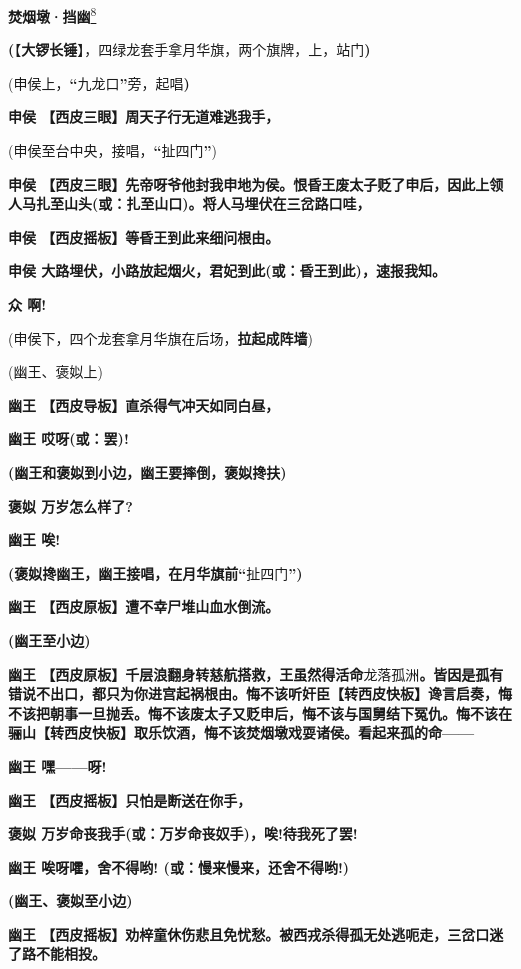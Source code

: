 \textbf{焚烟墩·挡幽}\protect\hyperlink{fn8}{\textsuperscript{8}}

\textbf{(}【\textbf{大锣长锤}】，四绿龙套手拿月华旗，两个旗牌，上，站门\textbf{)}

(申侯上，\textbf{``}九龙口\textbf{''}旁，起唱\textbf{)}

\textbf{申侯 【西皮三眼】周天子行无道难逃我手，}

(申侯至台中央，接唱，\textbf{``}扯四门\textbf{''})

\textbf{申侯
【西皮三眼】先帝呀爷他封我申地为侯。恨昏王废太子贬了申后，因此上领人马扎至山头(或：扎至山口)。将人马埋伏在三岔路口哇，}

\textbf{申侯 【西皮摇板】等昏王到此来细问根由。}

\textbf{申侯 大路埋伏，小路放起烟火，君妃到此(或：昏王到此)，速报我知。}

\textbf{众 啊!}

(申侯下，四个龙套拿月华旗在后场，\textbf{拉起成阵墙})

(幽王、褒姒上)

\textbf{幽王 【西皮导板】直杀得气冲天如同白昼，}

\textbf{幽王 哎呀(或：罢)!}

\textbf{(幽王和褒姒到小边，幽王要摔倒，褒姒搀扶)}

\textbf{褒姒 万岁怎么样了?}

\textbf{幽王 唉!}

\textbf{(褒姒搀幽王，幽王接唱，在月华旗前``}扯四门\textbf{'')}

\textbf{幽王 【西皮原板】遭不幸尸堆山血水倒流。}

\textbf{(幽王至小边)}

\textbf{幽王
【西皮原板】千层浪翻身转慈航搭救，王虽然得活命}龙落孤洲\textbf{。皆因是孤有错说不出口，都只为你进宫起祸根由。悔不该听奸臣【转西皮快板】谗言启奏，悔不该把朝事一旦抛丢。悔不该废太子又贬申后，悔不该与国舅结下冤仇。悔不该在骊山【转西皮快板】取乐饮酒，悔不该焚烟墩戏耍诸侯。看起来孤的命------}

\textbf{幽王 嘿------呀!}

\textbf{幽王 【西皮摇板】只怕是断送在你手，}

\textbf{褒姒 万岁命丧我手(或：万岁命丧奴手)，唉!待我死了罢!}

\textbf{幽王 唉呀嚯，舍不得哟! (或：慢来慢来，还舍不得哟!)}

\textbf{(幽王、褒姒至小边)}

\textbf{幽王
【西皮摇板】劝梓童休伤悲且免忧愁。被西戎杀得孤无处逃呃走，三岔口迷了路不能相投。}

